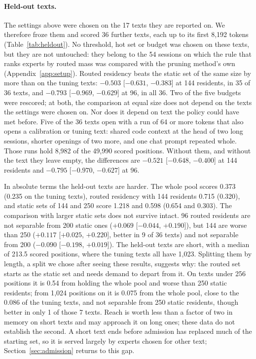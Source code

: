 \documentclass[11pt]{article}
\newcommand{\ci}[2]{[$#1$, $#2$]}
\begin{document}
\paragraph{Held-out texts.} The settings above were chosen on the 17 texts they are reported
on. We therefore froze them and scored 36 further texts, each up to its first
8{,}192 tokens (Table~\ref{tab:heldout}). No threshold, hot set or budget was chosen on these texts, but they are not untouched: they belong to the 54 sessions on which the rule that ranks experts by routed mass was compared with the pruning method's own (Appendix~\ref{app:setup}). Routed residency beats the static set of the same
size by more than on the tuning texts: $-0.503$ \ci{-0.631}{-0.383} at 144 residents, in 35 of
36 texts, and $-0.793$ \ci{-0.969}{-0.629} at 96, in all 36. Two of the five budgets were rescored; at both, the comparison at equal size
does not depend on the texts the settings were chosen on. Nor does it depend on text the policy could have met before. Five of the 36 texts open with a run of 64 or more tokens that also opens a calibration or tuning text: shared code context at the head of two long sessions, shorter openings of two more, and one chat prompt repeated whole. Those runs hold 8{,}982 of the 49{,}990 scored positions. Without them, and without the text they leave empty, the differences are $-0.521$ \ci{-0.648}{-0.400} at 144 residents and $-0.795$ \ci{-0.970}{-0.627} at 96.

In absolute terms the held-out texts are harder. The whole pool scores 0.373 (0.235 on the tuning texts), routed residency with 144 residents 0.715 (0.320), and static sets of 144 and 250 score 1.218 and 0.598 (0.654 and 0.303). The comparison with larger static sets does not survive intact. 96 routed residents are not separable
from 200 static ones ($+0.069$ \ci{-0.044}{+0.190}), but 144 are worse than
250 ($+0.117$ \ci{+0.025}{+0.220}, better in 9 of 36 texts) and not separable from 200 ($-0.090$ \ci{-0.198}{+0.019}). The held-out texts are short, with a median of 213.5 scored
positions, where the tuning texts all have 1{,}023. Splitting them by length, a split we chose after seeing these results, suggests why: the routed set starts as the static set and needs demand to
depart from it. On texts under 256 positions it is 0.54 from holding the whole pool and worse than 250 static residents; from
1{,}024 positions on it is 0.075 from the whole pool, close to the 0.086 of the tuning texts, and
not separable from 250 static residents, though better in only 1 of those 7 texts. Reach is worth less than a factor of two in memory on short texts and may approach it on long ones; these data do not establish the second. A short text ends before admission has replaced much of the starting set, so it is served largely by experts chosen for other text; Section~\ref{sec:admission} returns to this gap.
\end{document}
